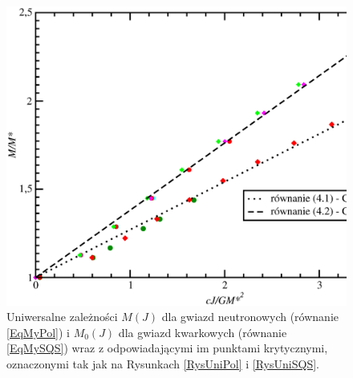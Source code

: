 \documentclass{bachelor_thesis}
\begin{document}
            \begin{figure}[h!]
            \centering
            \includegraphics[scale=.47]{figures/RysUniPolSQS.eps}
            \caption{Uniwersalne zależności $M(J)$ dla gwiazd neutronowych (równanie \ref{EqMyPol}) i $M_0(J)$ dla gwiazd kwarkowych (równanie \ref{EqMySQS}) wraz z odpowiadającymi im punktami krytycznymi, oznaczonymi tak jak na Rysunkach \ref{RysUniPol} i \ref{RysUniSQS}.}
            \label{RysUniPolSQS}
            \end{figure}
\end{document}
